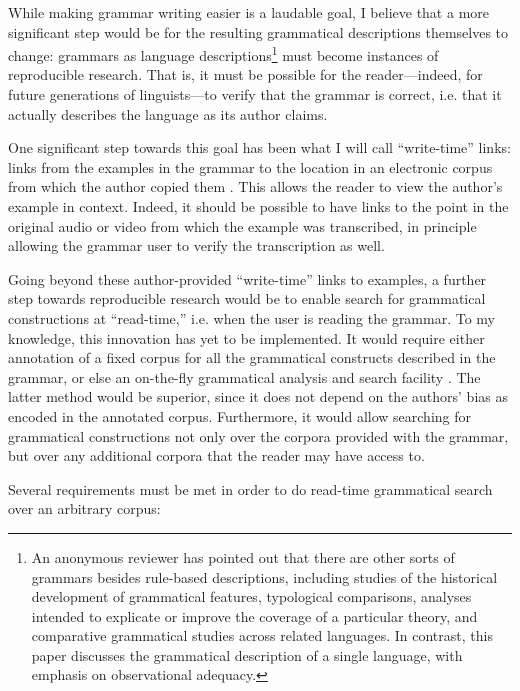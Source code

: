 While making grammar writing easier is a laudable goal, I believe that a more significant step would be for the resulting grammatical descriptions themselves to change: grammars as language descriptions\footnote{An
  anonymous reviewer has pointed out that there are other sorts of grammars besides rule-based descriptions, including studies of the historical development of grammatical features, typological comparisons, analyses intended to explicate or improve the coverage of a particular theory, and comparative grammatical studies across related languages. In contrast, this paper discusses the grammatical description of a single language, with emphasis on observational adequacy.} must become instances of reproducible research. That is, it must be possible for the reader---indeed, for future generations of linguists---to verify that the grammar is correct, i.e. that it actually describes the language as its author claims. 

One significant step towards this goal has been what I will call ``write-time'' links: links from the examples in the grammar to the location in an electronic corpus from which the author copied them \citep{Nordhoff2008,Thieberger2009}. This allows the reader to view the author's example in context. Indeed, it should be possible to have links to the point in the original audio or video from which the example was transcribed, in principle allowing the grammar user to verify the transcription as well.

Going beyond these author-provided ``write-time'' links to examples, a further step towards reproducible research would be to enable search for grammatical constructions at ``read-time,'' i.e. when the user is reading the grammar. To my knowledge, this innovation has yet to be  implemented. It would require either annotation of a fixed corpus for all the grammatical constructs described in the grammar, or else an on-the-fly grammatical analysis and search facility \citep{Thiebergertv}. The latter method would be superior, since it does not depend on the authors' bias as encoded in the annotated corpus. Furthermore, it would allow searching for grammatical constructions not only over the corpora provided with the grammar, but over any additional corpora that the reader may have access to. 

Several requirements must be met in order to do read-time grammatical search over an arbitrary corpus:

